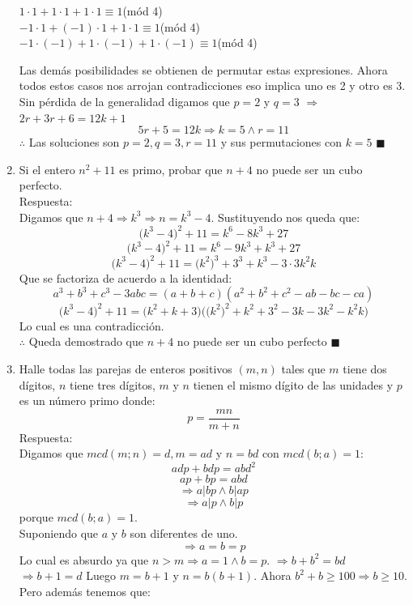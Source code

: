\documentclass{book}
\begin{document}
\begin{enumerate}
\begin{center}
$1 \cdot 1 + 1 \cdot 1 + 1 \cdot 1 \equiv 1$(mód 4)\\ 
$-1 \cdot 1 + (-1) \cdot 1 + 1 \cdot 1 \equiv 1$(mód 4) \\
$-1 \cdot (-1) + 1 \cdot (-1) + 1 \cdot (-1) \equiv 1$(mód 4) \\
 			\end{center}
				Las demás posibilidades se obtienen de permutar estas expresiones. Ahora todos estos casos nos arrojan contradicciones eso implica uno es 2  y otro es 3.\\ 
Sin pérdida de la generalidad  digamos que $p= 2$ y $q= 3$ $\Rightarrow$ $2r + 3r + 6 = 12k + 1$ 
$$5r + 5 = 12k \Rightarrow k = 5 \wedge r= 11$$ 
$\therefore$ Las soluciones son $p= 2, q= 3, r= 11$ y sus permutaciones con $k= 5$ $\blacksquare$ \\ 
			\item Si el entero $n^2 + 11$ es primo, probar que $n + 4$ no puede ser un cubo perfecto.\\
			Respuesta:\\
			Digamos que $n + 4 \Rightarrow k^3\Rightarrow n = k^3 - 4$. Sustituyendo nos queda que:  
				$$\big(k^3 - 4\big)^2 + 11 = k^6 - 8k^3 + 27$$ 
 				$$\big(k^3 - 4\big)^2 + 11 = k^6 - 9k^3 + k^3 + 27$$ 
				$$\big(k^3 - 4\big)^2 + 11 = \big(k^2\big)^3 + 3^3 + k^3 - 3 \cdot 3k^2k$$ 
			Que se factoriza de acuerdo a la identidad: 
$$a^3 + b^3 + c^3 - 3abc = (a + b + c)(a^2 + b^2 + c^2 - ab - bc - ca)$$ 
$$\big(k^3 - 4\big)^2 + 11 = \big(k^2 + k + 3\big)\big(\big(k^2\big)^2 + k^2 + 3^2 - 3k - 3k^2 - k^2k\big)$$ 
Lo cual es una contradicción. \\ 
$\therefore$ Queda demostrado que $n + 4$ no puede ser un cubo perfecto $\blacksquare$\\
			\item  Halle todas las parejas de enteros positivos $(m,n)$ tales que $m$ tiene dos dígitos, $n$ tiene tres dígitos, $m$ y 					$n$ tienen el mismo dígito de las unidades y $p$ es un número primo donde:
			$$p=\frac{mn}{m+n}$$
			Respuesta:\\
			Digamos que $mcd(m;n) = d, m = ad$ y $n = bd$ con $mcd(b;a) = 1$: 
 				$$adp + bdp = abd^2$$ 
				$$ap + bp = abd$$ 
				$$\Rightarrow a |bp    \wedge   b| ap $$ 
				$$\Rightarrow a| p    \wedge   b |p $$  
				porque $mcd(b;a) =1$. \\
				Suponiendo que $a$ y $b$ son diferentes de  uno. 
				$$\Rightarrow a=b=p$$
				Lo cual es absurdo ya que $n > m \Rightarrow a = 1 \wedge b=p$. $\Rightarrow 				b + b^2 = bd$ 
				$\Rightarrow b + 1 = d$ Luego $m = b + 1$ y $n = b(b + 1)$. Ahora $b^2 + b 						\geq 100 \Rightarrow b \geq 10$. Pero además tenemos que: 

\end{enumerate}
\end{document}
